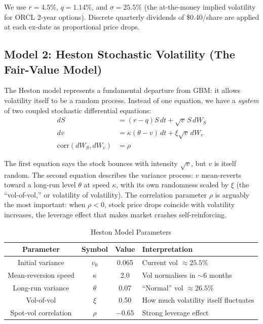 \documentclass[12pt,a4paper]{article}
\begin{document}
We use $r = 4.5\%$, $q = 1.14\%$, and $\sigma = 25.5\%$ (the at-the-money implied volatility for ORCL 2-year options). Discrete quarterly dividends of \$0.40/share are applied at each ex-date as proportional price drops.

\subsection{Model 2: Heston Stochastic Volatility (The Fair-Value Model)}

The Heston model \citep{heston1993} represents a fundamental departure from GBM: it allows volatility itself to be a random process. Instead of one equation, we have a \textit{system} of two coupled stochastic differential equations:
\begin{align}
    dS &= (r-q)S\,dt + \sqrt{v}\,S\,dW_S \\
    dv &= \kappa(\theta - v)\,dt + \xi\sqrt{v}\,dW_v \\
    \text{corr}(dW_S, dW_v) &= \rho
\end{align}

The first equation says the stock bounces with intensity $\sqrt{v}$, but $v$ is itself random. The second equation describes the variance process: $v$ mean-reverts toward a long-run level $\theta$ at speed $\kappa$, with its own randomness scaled by $\xi$ (the ``vol-of-vol,'' or volatility of volatility). The correlation parameter $\rho$ is arguably the most important: when $\rho < 0$, stock price drops coincide with volatility increases, the leverage effect that makes market crashes self-reinforcing.

\begin{table}[H]
\centering
\caption{Heston Model Parameters}
\label{tab:heston}
\begin{tabular}{@{}cccl@{}}
\toprule
\textbf{Parameter} & \textbf{Symbol} & \textbf{Value} & \textbf{Interpretation} \\
\midrule
Initial variance & $v_0$ & 0.065 & Current vol $\approx 25.5\%$ \\
Mean-reversion speed & $\kappa$ & 2.0 & Vol normalises in $\sim$6 months \\
Long-run variance & $\theta$ & 0.07 & ``Normal'' vol $\approx 26.5\%$ \\
Vol-of-vol & $\xi$ & 0.50 & How much volatility itself fluctuates \\
Spot-vol correlation & $\rho$ & $-0.65$ & Strong leverage effect \\
\bottomrule
\end{tabular}
\end{table}
\end{document}
